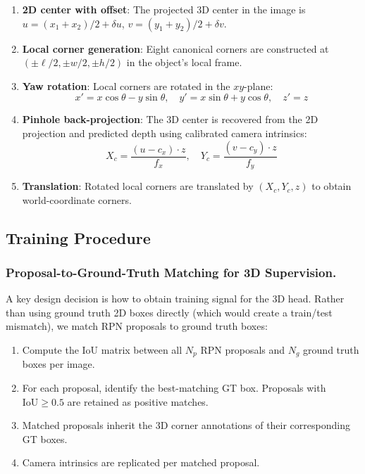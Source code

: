 \documentclass[runningheads]{llncs}
\begin{document}
\begin{enumerate}
    \item \textbf{2D center with offset}: The projected 3D center in the image is $u = (x_1 + x_2)/2 + \delta u$, $v = (y_1 + y_2)/2 + \delta v$.
    
    \item \textbf{Local corner generation}: Eight canonical corners are constructed at $(\pm\ell/2, \pm w/2, \pm h/2)$ in the object's local frame.
    
    \item \textbf{Yaw rotation}: Local corners are rotated in the $xy$-plane:
    \begin{equation}
        x' = x\cos\theta - y\sin\theta, \quad y' = x\sin\theta + y\cos\theta, \quad z' = z
    \end{equation}
    
    \item \textbf{Pinhole back-projection}: The 3D center is recovered from the 2D projection and predicted depth using calibrated camera intrinsics:
    \begin{equation}
        X_c = \frac{(u - c_x) \cdot z}{f_x}, \quad Y_c = \frac{(v - c_y) \cdot z}{f_y}
    \end{equation}
    
    \item \textbf{Translation}: Rotated local corners are translated by $(X_c, Y_c, z)$ to obtain world-coordinate corners.
\end{enumerate}


\subsection{Training Procedure}
\label{sec:training}

\subsubsection{Proposal-to-Ground-Truth Matching for 3D Supervision.}
\label{sec:matching}
A key design decision is how to obtain training signal for the 3D head.
Rather than using ground truth 2D boxes directly (which would create a train/test mismatch), we match RPN proposals to ground truth boxes:

\begin{enumerate}
    \item Compute the IoU matrix between all $N_p$ RPN proposals and $N_g$ ground truth boxes per image.
    \item For each proposal, identify the best-matching GT box. Proposals with $\text{IoU} \geq 0.5$ are retained as positive matches.
    \item Matched proposals inherit the 3D corner annotations of their corresponding GT boxes.
    \item Camera intrinsics are replicated per matched proposal.
\end{enumerate}
\end{document}
